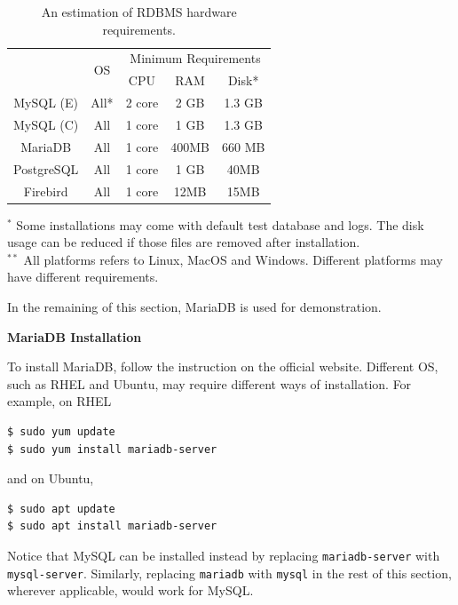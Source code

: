 \begin{table}
	\centering \caption{An estimation of RDBMS hardware requirements.} \label{ch:db:tab:rdbrequirements}
	\begin{tabular}{|c|c|c|c|c|}
		\hline
		 & \multirow{2}{*}{OS} & \multicolumn{3}{c|}{Minimum Requirements} \\ \cline{3-5}
		 & & CPU & RAM & Disk* \\ \hline
		 MySQL (E) & All* & 2 core & 2 GB & 1.3 GB \\ \hline
		 MySQL (C) & All & 1 core & 1 GB & 1.3 GB \\ \hline 
		 MariaDB & All & 1 core & 400MB & 660 MB \\ \hline 
		 PostgreSQL & All & 1 core & 1 GB & 40MB \\ \hline
		 Firebird & All & 1 core & 12MB & 15MB \\ \hline  
	\end{tabular}
	\begin{flushleft}
	\footnotesize
	$^{*}$ Some installations may come with default test database and logs. The disk usage can be reduced if those files are removed after installation. \\
	$^{**}$ All platforms refers to Linux, MacOS and Windows. Different platforms may have different requirements. \\
    \end{flushleft}
\end{table}

In the remaining of this section, MariaDB is used for demonstration.

\vspace{0.1in}
\noindent \textbf{MariaDB Installation}
\vspace{0.1in}

To install MariaDB, follow the instruction on the official website. Different OS, such as RHEL and Ubuntu, may require different ways of installation. For example, on RHEL
\begin{lstlisting}
$ sudo yum update
$ sudo yum install mariadb-server
\end{lstlisting}
and on Ubuntu,
\begin{lstlisting}
$ sudo apt update
$ sudo apt install mariadb-server
\end{lstlisting}
Notice that MySQL can be installed instead by replacing \verb|mariadb-server| with \verb|mysql-server|. Similarly, replacing \verb|mariadb| with \verb|mysql| in the rest of this section, wherever applicable, would work for MySQL.

